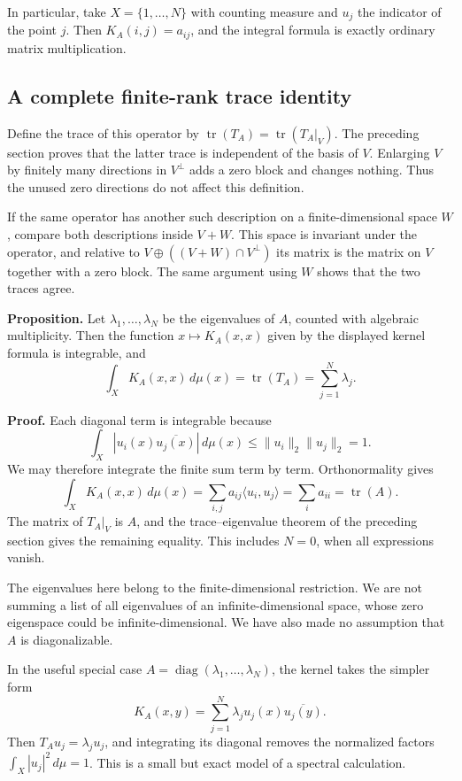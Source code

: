 In particular, take \(X=\{1,\ldots,N\}\) with counting measure and \(u_j\) the indicator of the point \(j\). Then \(K_A(i,j)=a_{ij}\), and the integral formula is exactly ordinary matrix multiplication.

\subsection{A complete finite-rank trace identity}\label{finite-kernel-trace-identity}

Define the trace of this operator by
\(\operatorname{tr}(T_A)=\operatorname{tr}(T_A|_V)\).
The preceding section proves that the latter trace is independent of the basis of \(V\). Enlarging \(V\) by finitely many directions in \(V^\perp\) adds a zero block and changes nothing. Thus the unused zero directions do not affect this definition.

If the same operator has another such description on a finite-dimensional space \(W\), compare both descriptions inside \(V+W\). This space is invariant under the operator, and relative to \(V\oplus((V+W)\cap V^\perp)\) its matrix is the matrix on \(V\) together with a zero block. The same argument using \(W\) shows that the two traces agree.

\textbf{Proposition.} Let \(\lambda_1,\ldots,\lambda_N\) be the eigenvalues of \(A\), counted with algebraic multiplicity. Then the function \(x\mapsto K_A(x,x)\) given by the displayed kernel formula is integrable, and
\[
\boxed{\int_X K_A(x,x)\,d\mu(x)
=\operatorname{tr}(T_A)
=\sum_{j=1}^N\lambda_j.}
\]

\textbf{Proof.} Each diagonal term is integrable because
\[
\int_X |u_i(x)\overline{u_j(x)}|\,d\mu(x)
\leq\|u_i\|_2\|u_j\|_2=1.
\]
We may therefore integrate the finite sum term by term. Orthonormality gives
\[
\int_X K_A(x,x)\,d\mu(x)
=\sum_{i,j}a_{ij}\langle u_i,u_j\rangle
=\sum_i a_{ii}
=\operatorname{tr}(A).
\]
The matrix of \(T_A|_V\) is \(A\), and the trace--eigenvalue theorem of the preceding section gives the remaining equality. This includes \(N=0\), when all expressions vanish.

The eigenvalues here belong to the finite-dimensional restriction. We are not summing a list of all eigenvalues of an infinite-dimensional space, whose zero eigenspace could be infinite-dimensional. We have also made no assumption that \(A\) is diagonalizable.

In the useful special case \(A=\operatorname{diag}(\lambda_1,\ldots,\lambda_N)\), the kernel takes the simpler form
\[
K_A(x,y)=\sum_{j=1}^N\lambda_j u_j(x)\overline{u_j(y)}.
\]
Then \(T_Au_j=\lambda_j u_j\), and integrating its diagonal removes the normalized factors \(\int_X|u_j|^2\,d\mu=1\). This is a small but exact model of a spectral calculation.


